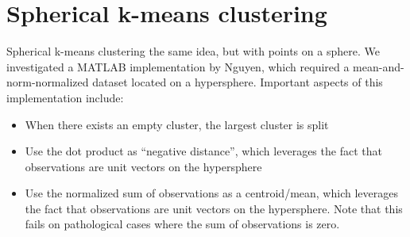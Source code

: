 \documentclass[../tech_report_1.tex]{subfiles}
\begin{document}
\section*{Spherical k-means clustering}

Spherical k-means clustering the same idea, but with points on a sphere.
We investigated a MATLAB implementation by Nguyen\cite{nguyen2008gene,nguyen_spherical_clustering},
which required a mean-and-norm-normalized dataset located on a hypersphere.
Important aspects of this implementation include:
\begin{itemize}
\item When there exists an empty cluster, the largest cluster is split
\item Use the dot product as ``negative distance'', which leverages the
fact that observations are unit vectors on the hypersphere
\item Use the normalized sum of observations as a centroid/mean, which leverages
the fact that observations are unit vectors on the hypersphere. Note
that this fails on pathological cases where the sum of observations
is zero.
\end{itemize}
\end{document}
